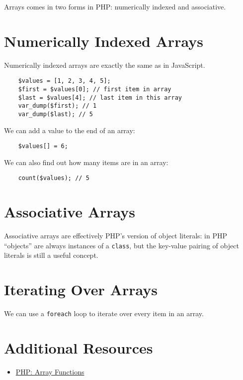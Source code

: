 Arrays comes in two forms in PHP: numerically indexed and associative.
\\


\section{Numerically Indexed Arrays}

Numerically indexed arrays are exactly the same as in JavaScript.

\begin{verbatim}
    $values = [1, 2, 3, 4, 5];
    $first = $values[0]; // first item in array
    $last = $values[4]; // last item in this array
    var_dump($first); // 1
    var_dump($last); // 5
\end{verbatim}

We can add a value to the end of an array:

\begin{verbatim}
    $values[] = 6;
\end{verbatim}

We can also find out how many items are in an array:

\begin{verbatim}
    count($values); // 5
\end{verbatim}


\section{Associative Arrays}

Associative arrays are effectively PHP's version of object literals: in PHP ``objects'' are always instances of a \texttt{class}, but the key-value pairing of object literals is still a useful concept.


\section{Iterating Over Arrays}

We can use a \texttt{foreach} loop to iterate over every item in an array.



\section{Additional Resources}

\begin{itemize}[leftmargin=*]
    \item \href{https://www.php.net/manual/en/ref.array.php}{PHP: Array Functions}
\end{itemize}
